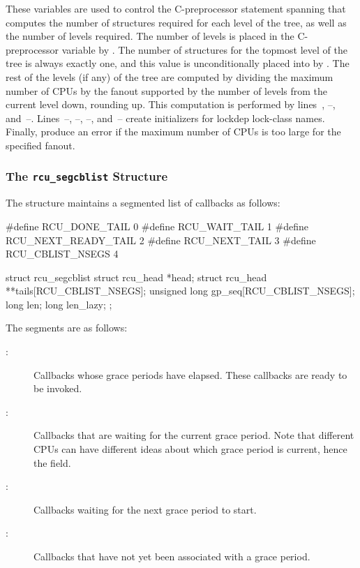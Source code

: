 \begin{fcvref}
These variables are used to control the C-preprocessor  statement
spanning  %
that computes the number of  structures
required for each level of the tree, as well as the number of levels
required.
The number of levels is placed in the 
C-preprocessor variable by . %
The number of
 structures for the topmost level of the tree is always
exactly one, and this value is unconditionally placed into
 by . %
The rest of the levels
(if any) of the  tree are computed by dividing the maximum
number of CPUs by the fanout supported by the number of levels from the
current level down, rounding up.
This computation is performed by
lines~, --, and~--. %
Lines~--, %
--, %
--, %
and~-- %
create
initializers for lockdep lock-class names.
Finally,  %
produce
an error if the maximum number of CPUs is too large for the specified
fanout.
\end{fcvref}

\subsubsection{The \texttt{rcu\_segcblist} Structure}

The  structure maintains a segmented list of callbacks
as follows:

\begin{VerbatimN}
	#define RCU_DONE_TAIL        0
	#define RCU_WAIT_TAIL        1
	#define RCU_NEXT_READY_TAIL  2
	#define RCU_NEXT_TAIL        3
	#define RCU_CBLIST_NSEGS     4

	struct rcu_segcblist {
		struct rcu_head *head;
		struct rcu_head **tails[RCU_CBLIST_NSEGS];
		unsigned long gp_seq[RCU_CBLIST_NSEGS];
		long len;
		long len_lazy;
	};
\end{VerbatimN}

The segments are as follows:

\begin{description}
\item[:]
   Callbacks whose grace periods have elapsed.
   These
   callbacks are ready to be invoked.
\item[:]
   Callbacks that are waiting for the current grace
   period.
   Note that different CPUs can have different ideas about which
   grace period is current, hence the  field.
\item[:]
   Callbacks waiting for the next grace period
   to start.
\item[:]
   Callbacks that have not yet been associated with a
   grace period.
\end{description}

